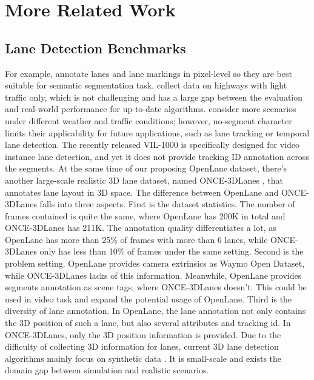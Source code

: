 \documentclass[runningheads]{llncs}
\begin{document}
\clearpage




\clearpage
\appendix
{}
\renewcommand{\appendixname}{Appendix~\Alph{section}}
\section{More Related Work}\label{sec: sup}



\subsection{Lane Detection Benchmarks}
For example, \cite{lee2017vpgnet,huang2019apolloscape,yu2020bdd100k} annotate lanes and lane markings in pixel-level so they are best suitable for semantic segmentation task. 
\cite{tusimple2017,llamas2019} collect data on highways with light traffic only, which is not challenging and has a large gap between the evaluation and real-world performance for up-to-date algorithms. 
\cite{pan2018spatial,xu2020curvelane} consider more scenarios under different weather and traffic conditions; however, no-segment character limits their applicability for future applications, such as lane tracking or temporal lane detection. 
The recently released VIL-1000 \cite{zhang2021vil} is specifically designed for video instance lane detection, and yet it does not provide tracking ID annotation across the segments. 
At the same time of our proposing OpenLane dataset, there's another large-scale realistic 3D lane dataset, named ONCE-3DLanes \cite{yan2022once3dlane}, that annotates lane layout in 3D space.
The difference between OpenLane and ONCE-3DLanes falls into three aspects.
First is the dataset statistics. 
The number of frames contained is quite the same, where OpenLane has 200K in total and ONCE-3DLanes has 211K.
The annotation quality differentiates a lot, as OpenLane has more than 25\% of frames with more than 6 lanes, while ONCE-3DLanes only has less than 10\% of frames under the same setting.
Second is the problem setting.
OpenLane provides camera extrinsics as Waymo Open Dataset, while ONCE-3DLanes lacks of this information.
Meanwhile, OpenLane provides segments annotation as scene tags, where ONCE-3DLanes doesn't.
This could be used in video task and expand the potential usage of OpenLane.
Third is the diversity of lane annotation.
In OpenLane, the lane annotation not only contains the 3D position of such a lane, but also several attributes and tracking id.
In ONCE-3DLanes, only the 3D position information is provided.
Due to the difficulty of collecting 3D information for lanes, current 3D lane detection algorithms mainly focus on synthetic data \cite{guo2020gen}. It is small-scale and exists the domain gap between simulation and realistic scenarios. 
\end{document}
